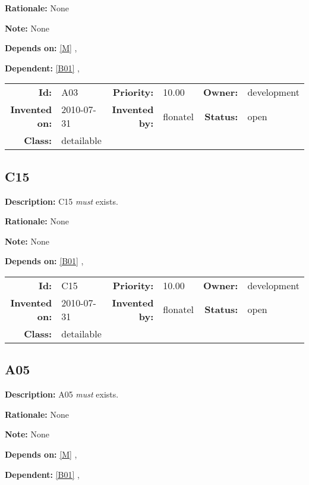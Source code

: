 \textbf{Rationale:} None

\textbf{Note:} None

\textbf{Depends on:} \ref{M} , 

\textbf{Dependent:} \ref{B01} , 

\par
{\small \begin{center}\begin{tabular}{rlrlrl}
\textbf{Id:} & A03 & \textbf{Priority:} & 10.00 & \textbf{Owner:} & development \\ 
\textbf{Invented on:} & 2010-07-31 & \textbf{Invented by:} & flonatel & \textbf{Status:} & open \\ 
\textbf{Class:} & detailable & & & & \\ 
\end{tabular}\end{center} }%
\subsection{C15}\label{C15}
\textbf{Description:} C15 \textsl{must} exists.

\textbf{Rationale:} None

\textbf{Note:} None

\textbf{Depends on:} \ref{B01} , 

\par
{\small \begin{center}\begin{tabular}{rlrlrl}
\textbf{Id:} & C15 & \textbf{Priority:} & 10.00 & \textbf{Owner:} & development \\ 
\textbf{Invented on:} & 2010-07-31 & \textbf{Invented by:} & flonatel & \textbf{Status:} & open \\ 
\textbf{Class:} & detailable & & & & \\ 
\end{tabular}\end{center} }%
\subsection{A05}\label{A05}
\textbf{Description:} A05 \textsl{must} exists.

\textbf{Rationale:} None

\textbf{Note:} None

\textbf{Depends on:} \ref{M} , 

\textbf{Dependent:} \ref{B01} , 

